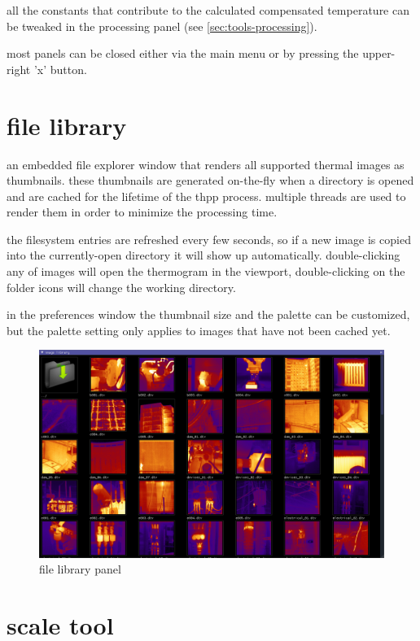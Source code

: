 \documentclass[12pt,twoside,a4paper,notitlepage]{report}
\begin{document}
all the constants that contribute to the calculated compensated temperature can be tweaked in the processing panel (see \ref{sec:tools-processing}).

most panels can be closed either via the main menu or by pressing the upper-right 'x' button.

\newpage

\section{file library} \label{sec:file-library}

an embedded file explorer window that renders all supported thermal images as thumbnails. these thumbnails are generated on-the-fly when a directory is opened and are cached for the lifetime of the thpp process. multiple threads are used to render them in order to minimize the processing time.

the filesystem entries are refreshed every few seconds, so if a new image is copied into the currently-open directory it will show up automatically. double-clicking any of images will open the thermogram in the viewport, double-clicking on the folder icons will change the working directory.

in the preferences window the thumbnail size and the palette can be customized, but the palette setting only applies to images that have not been cached yet.

\begin{figure}[ht]
 \centering
 \includegraphics[width=14cm, keepaspectratio=true]{img/file_library}
 \caption{file library panel}
 \label{fig:file-library-overview}
\end{figure}

\section{scale tool} \label{sec:tools-scale}
\end{document}
